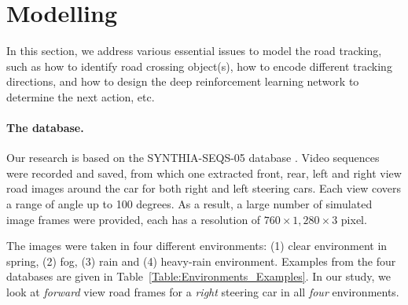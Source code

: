\documentclass{svproc}
\begin{document}
\section{Modelling}
In this section, we address various essential issues to model the road tracking, such as how to identify road crossing object(s), how to encode different tracking directions, and how to design the deep reinforcement learning network to determine the next action, etc. 

\paragraph{The database.} Our research is based on the SYNTHIA-SEQS-05 database \cite{Ros2016TheSYNTHIA}. Video sequences were recorded and saved, from which one extracted front, rear, left and right view road images around the car for both right and left steering cars. Each view covers a range of angle up to 100 degrees. As a result, a large number of simulated image frames were provided, each has a resolution of $760 \times 1,280 \times 3$ pixel. 
	
The images were taken in four different environments: (1) clear environment in spring, (2) fog, (3) rain and (4) heavy-rain environment. Examples from the four databases are given in Table~\ref{Table:Environments_Examples}.	In our study, we look at \emph{forward} view road frames for a \emph{right} steering car in all \emph{four} environments. 
	
\end{document}
